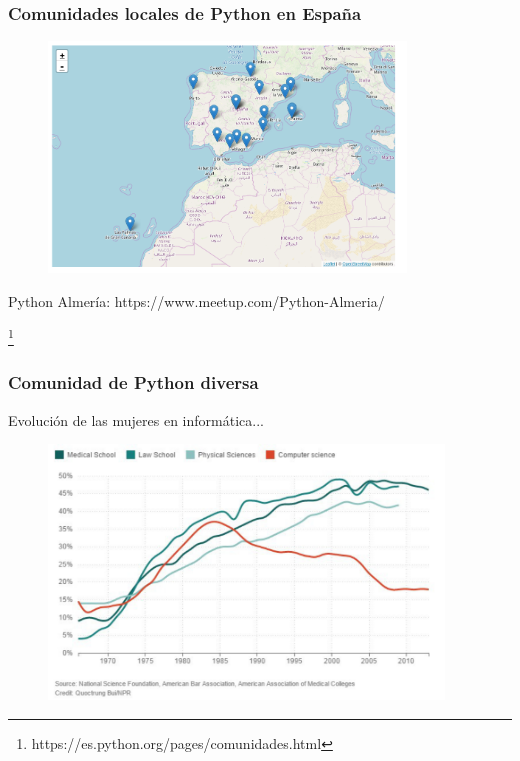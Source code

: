 \documentclass[18pt]{beamer}
\newcommand\blfootnote[1]{%
  \begingroup
  \renewcommand\thefootnote{}\footnote{#1}%
  \addtocounter{footnote}{-1}%
  \endgroup
}
\begin{document}
\begin{frame}

	\frametitle{Comunidades locales de Python en España}
	
	\begin{figure}
		\includegraphics[width=9.5cm]{images/comunidades_locales.png}
	\end{figure}

	\centerline{Python Almería: https://www.meetup.com/Python-Almeria/}		
	
	\blfootnote{\scriptsize https://es.python.org/pages/comunidades.html}
	
\end{frame}


\begin{frame}

	\frametitle{Comunidad de Python diversa}
	
	Evolución de las mujeres en informática...
	
	\begin{figure}
		\includegraphics[width=10.5cm]{images/women_computer_science.png}
	\end{figure}
		
\end{frame}
\end{document}
